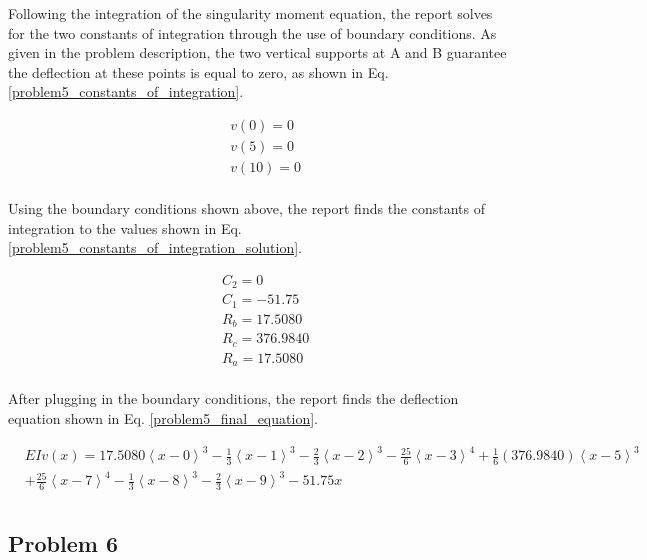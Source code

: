 \documentclass[a4paper]{article}
\begin{document}
Following the integration of the singularity moment equation, the report solves for the two constants of integration through the use of boundary conditions. As given in the problem description, the two vertical supports at A and B guarantee the deflection at these points is equal to zero, as shown in Eq. \ref{problem5_constants_of_integration}.

\begin{equation}
\begin{split}
	& v(0) = 0 \\
	& v(5) = 0 \\
	& v(10) = 0 \\
\end{split}
\label{problem5_constants_of_integration}
\end{equation}

Using the boundary conditions shown above, the report finds the constants of integration to the values shown in Eq. \ref{problem5_constants_of_integration_solution}.

\begin{equation}
\begin{split}
	& C_2 = 0 \\
	& C_1 = -51.75 \\
	& R_b = 17.5080 \\
	& R_c = 376.9840\\
	& R_a = 17.5080 \\
\end{split}
\label{problem5_constants_of_integration_solution}
\end{equation}

After plugging in the boundary conditions, the report finds the deflection equation shown in Eq. \ref{problem5_final_equation}.

\begin{equation}
\begin{split}
& EI v(x) = 17.5080\left<x-0\right>^3 - \frac{1}{3}\left<x-1\right>^3 -  \frac{2}{3}\left<x-2\right>^3 - \frac{25}{6}\left<x-3\right>^4 + \frac{1}{6}(376.9840)\left<x-5\right>^3 \\
&  + \frac{25}{6}\left<x-7\right>^4 - \frac{1}{3}\left<x-8\right>^3 -  \frac{2}{3}\left<x-9\right>^3  -51.75x\\
\end{split}
\label{problem5_final_equation}
\end{equation}



\subsection{Problem 6}
\end{document}
